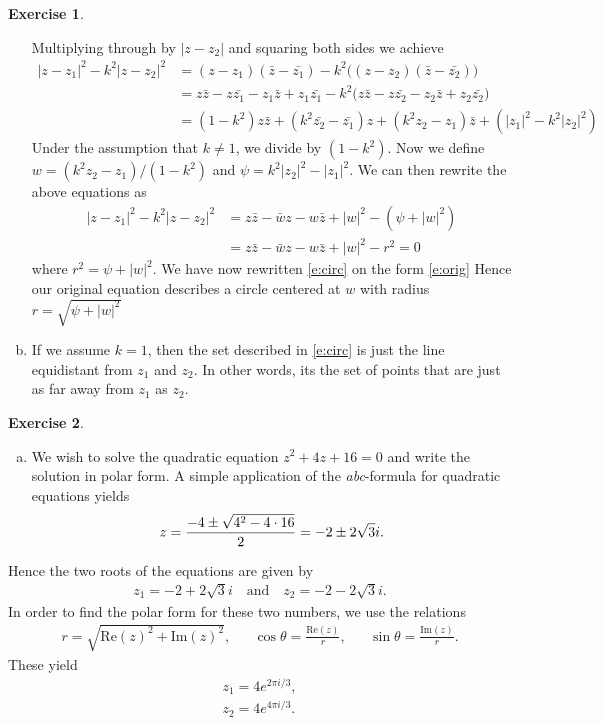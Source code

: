 \documentclass[10pt]{amsart}
\newcommand{\Rez}[1]{\mathrm{Re}(#1)}
\newcommand{\Imz}[1]{\mathrm{Im}(#1)}
\theoremstyle{definition}
\newtheorem{exercise}{Exercise}
\begin{document}
\begin{exercise}
\begin{enumerate}[a)]
    Multiplying through by $|z - z_2|$ and squaring both sides we achieve
    \begin{align*}
      |z - z_1|^2 - k^2|z - z_2|^2 &= (z - z_1)(\bar{z} - \bar{z_1}) - k^2 \big( (z - z_2)(\bar{z} - \bar{z_2}) \big) \\
                                   &= z\bar{z} - z\bar{z_1} - z_1\bar{z} + z_1\bar{z_1} - k^2\big( z\bar{z} - z\bar{z_2} - z_2\bar{z} + z_2\bar{z_2}\big) \\
                                   &= (1 - k^2)z\bar{z} + (k^2\bar{z_2} - \bar{z_1})z + (k^2z_2 - z_1)\bar{z} + (|z_1|^2 - k^2|z_2|^2)
    \end{align*}
    Under the assumption that $k \neq 1$, we divide by $(1 - k^2)$. Now we define ${w = \left( k^2 z_2 - z_1 \right) / (1 - k^2)}$ and $\psi = k^2|z_2|^2 - |z_1|^2 $. We can then rewrite the above equations as
    \begin{align*}
      |z - z_1|^2 - k^2|z - z_2|^2 &= z\bar{z} - \bar{w}z - w\bar{z} + |w|^2 - (\psi + |w|^2) \\
                                   &= z\bar{z} - \bar{w}z - w\bar{z} + |w|^2 - r^2 = 0
    \end{align*}
    where $r^2 = \psi + |w|^2$. We have now rewritten \cref{e:circ} on the form \cref{e:orig}
    Hence our original equation describes a circle centered at $w$ with radius $r = \sqrt{\psi + |w|^2}$    

    \item If we assume $k = 1$, then the set described in \cref{e:circ} is just the line equidistant from $z_1$ and $z_2$. In other words, its the set of points that are just as far away from $z_1$ as $z_2$.
  \end{enumerate}
\end{exercise}
\clearpage
\begin{exercise}\hfill
  \begin{enumerate}[a)]
    \item We wish to solve the quadratic equation $z^2 + 4z + 16 = 0$ and write the solution in polar form.
      A simple application of the \emph{abc}-formula for quadratic equations yields
      \begin{equation}
        \notag
        z = \frac{-4 \pm \sqrt{4^2 - 4\cdot 16}}{2} = -2 \pm 2\sqrt{3}i.
      \end{equation}
  \end{enumerate} 
  Hence the two roots of the equations are given by
  \begin{align*}
    z_1 = -2 + 2\sqrt{3}i \quad \text{and} \quad z_2 = -2 - 2\sqrt{3}i.
  \end{align*}
  In order to find the polar form for these two numbers, we use the relations
  \begin{align*}
    r = \sqrt{\Rez{z}^2 + \Imz{z}^2}, && \cos\theta = \frac{\Rez{z}}{r}, && \sin\theta = \frac{\Imz{z}}{r}.
  \end{align*}
  These yield
  \begin{align*}
    z_1 = 4e^{2\pi i /3}, \\
    z_2 = 4e^{4\pi i/ 3}.
  \end{align*}
\end{exercise}
\end{document}
